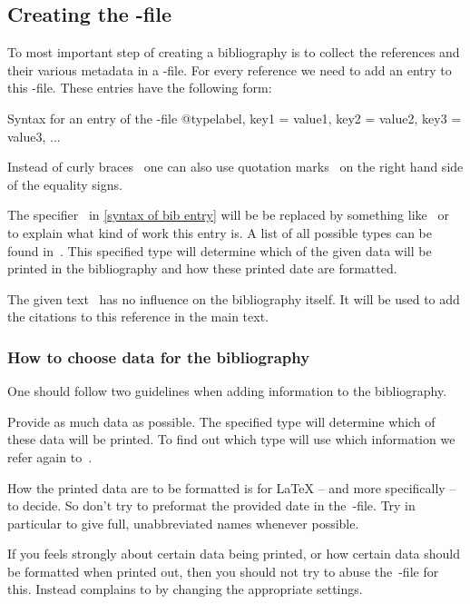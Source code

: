 \subsection{Creating the -file}

To most important step of creating a bibliography is to collect the references and their various metadata in a -file.
For every reference we need to add an entry to this -file.
These entries have the following form:
\begin{showcode}[label = {syntax of bib entry}]{Syntax for an entry of the -file}
@type{label,
  key1 = {value1},
  key2 = {value2},
  key3 = {value3},
  ...
}
\end{showcode}
Instead of curly braces~\inlinecode{\{ \}} one can also use quotation marks~ on the right hand side of the equality signs.

The specifier~ in \cref{syntax of bib entry} will be be replaced by something like~ or~ to explain what kind of work this entry is.
A list of all possible types can be found in~\cite[2.1]{biblatex}.
This specified type will determine which of the given data will be printed in the bibliography and how these printed date are formatted.

The given text~ has no influence on the bibliography itself.
It will be used to add the citations to this reference in the main text.

\subsubsection{How to choose data for the bibliography}

One should follow two guidelines when adding information to the bibliography.
\begin{myitemize}
  \item
    Provide as much data as possible.
    The specified type will determine which of these data will be printed.
    To find out which type will use which information we refer again to~\cite[2.1, 2.2]{biblatex}.
  \item
    How the printed data are to be formatted is for {\LaTeX} -- and more specifically  -- to decide.
    So don’t try to preformat the provided date in the~-file.
    Try in particular to give full, unabbreviated names whenever possible.
\end{myitemize}
If you feels strongly about certain data being printed, or how certain data should be formatted when printed out, then you should not try to abuse the~-file for this.
Instead complains to  by changing the appropriate settings.

